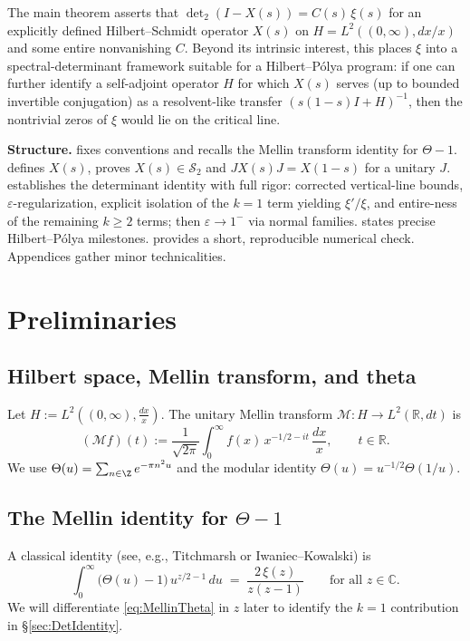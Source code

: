 \documentclass[11pt]{article}
\numberwithin{equation}{section}
\theoremstyle{definition}
\theoremstyle{remark}
\newcommand{\C}{\mathbb{C}}
\newcommand{\R}{\mathbb{R}}
\newcommand{\eps}{\varepsilon}
\newcommand{\Hs}{\mathcal{S}_2}
\newcommand{\Dettwo}{\operatorname{det}_2}
\newcommand{\1}{\mathbbm{1}}
\newcommand{\cM}{\mathcal{M}}
\begin{document}
The main theorem asserts that \(\Dettwo(I-X(s))=C(s)\,\xi(s)\) for an explicitly defined Hilbert--Schmidt operator \(X(s)\) on \(H=L^2((0,\infty),dx/x)\) and some entire nonvanishing \(C\). Beyond its intrinsic interest, this places \(\xi\) into a spectral-determinant framework suitable for a Hilbert--Pólya program: if one can further identify a self-adjoint operator \(H\) for which \(X(s)\) serves (up to bounded invertible conjugation) as a resolvent-like transfer \((s(1-s)I+H)^{-1}\), then the nontrivial zeros of \(\xi\) would lie on the critical line.

\medskip
\noindent\textbf{Structure.}  fixes conventions and recalls the Mellin transform identity for \(\Theta-1\).  defines \(X(s)\), proves \(X(s)\in\Hs\) and \(JX(s)J=X(1-s)\) for a unitary \(J\).  establishes the determinant identity with full rigor: corrected vertical-line bounds, \(\eps\)-regularization, explicit isolation of the \(k=1\) term yielding \(\xi'/\xi\), and entire-ness of the remaining \(k\ge 2\) terms; then \(\eps\to1^-\) via normal families.  states precise Hilbert--Pólya milestones.  provides a short, reproducible numerical check. Appendices gather minor technicalities.

\section{Preliminaries}\label{sec:Preliminaries}

\subsection{Hilbert space, Mellin transform, and theta}
Let \(H:=L^2((0,\infty),\tfrac{dx}{x})\). The unitary Mellin transform \(\cM: H\to L^2(\R,dt)\) is
\begin{equation}\label{eq:Mellin}
(\cM f)(t) := \frac{1}{\sqrt{2\pi}}\int_0^\infty f(x)\, x^{-1/2-it}\,\frac{dx}{x} ,\qquad t\in\R.
\end{equation}
We use \(\Theta(u)=\sum_{n\in\Z} e^{-\pi n^2 u}\) and the modular identity \(\Theta(u)=u^{-1/2}\Theta(1/u)\).

\subsection{The Mellin identity for \texorpdfstring{$\Theta-1$}{Theta-1}}
A classical identity (see, e.g., Titchmarsh or Iwaniec--Kowalski) is
\begin{equation}\label{eq:MellinTheta}
\int_0^\infty \big(\Theta(u)-1\big)\, u^{z/2-1}\,du \;=\; \frac{2\,\xi(z)}{z(z-1)} \qquad \text{for all } z\in\C.
\end{equation}
We will differentiate \eqref{eq:MellinTheta} in \(z\) later to identify the \(k=1\) contribution in \S\ref{sec:DetIdentity}.
\end{document}
